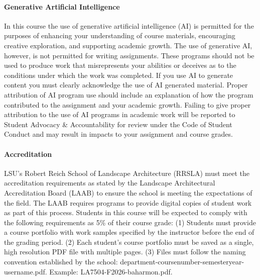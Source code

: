 \documentclass[11pt,article,oneside]{memoir}
\begin{document}
\paragraph{Generative Artificial Intelligence}
In this course the use of generative artificial intelligence (AI) 
is permitted for the purposes of enhancing your understanding 
of course materials, encouraging creative exploration, 
and supporting academic growth. 
The use of generative AI, however, 
is not permitted for writing assignments. 
These programs should not be used to produce work 
that misrepresents your abilities 
or deceives as to the conditions 
under which the work was completed. 
If you use AI to generate content 
you must clearly acknowledge the use of AI generated material. 
Proper attribution of AI program use
should include an explanation of how the program 
contributed to the assignment and your academic growth. 
Failing to give proper attribution 
to the use of AI programs in academic work
will be reported to Student Advocacy \& Accountability 
for review under the Code of Student Conduct 
and may result in impacts to your assignment and course grades.

\paragraph{Accreditation}
LSU's Robert Reich School of Landscape Architecture (RRSLA) 
must meet the accreditation requirements 
as stated by the Landscape Architectural Accreditation
Board (LAAB) to ensure the school
 is meeting the expectations of the field. 
The LAAB requires programs to provide digital copies 
of student work as part of this process.
Students in this course will be expected 
to comply with the following requirements
as 5\% of their course grade: 
(1) Students must provide a course portfolio
with work samples specified by the instructor 
before the end of the grading period. 
(2) Each student's course portfolio must be saved as 
a single, high resolution PDF file with multiple pages. 
(3) Files must follow the naming convention
established by the school: 
department-coursenumber-semesteryear-username.pdf.
Example: LA7504-F2026-baharmon.pdf.
\end{document}
